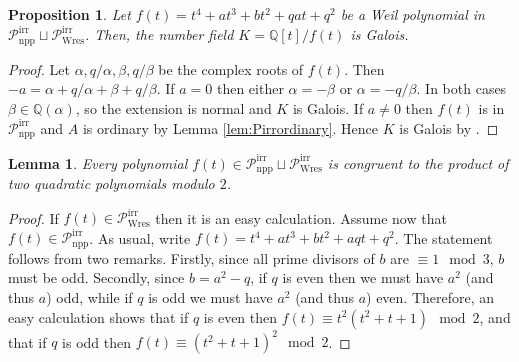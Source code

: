 \documentclass[11pt]{amsart}
\newcommand\Q{\mathbb{Q}}
\theoremstyle{plain}
\newtheorem{lemma}[theorem]{Lemma}
\newtheorem{proposition}[theorem]{Proposition}
\theoremstyle{definition}
\newcommand\PirrA{\mathcal{P}^\mathrm{irr}_\mathrm{npp}}
\newcommand\PirrB{\mathcal{P}^\mathrm{irr}_\mathrm{Wres}}
\begin{document}
\begin{proposition}\label{prop:galois}
    Let $f(t)=t^4+at^3+bt^2+qat+q^2$ be a Weil polynomial in $\PirrA\sqcup\PirrB$.
    Then, the number field $K=\Q[t]/f(t)$ is Galois.
\end{proposition}

\begin{proof}
    Let $\alpha, q/\alpha, \beta, q/\beta$ be the complex roots of $f(t)$.
    Then $-a=\alpha+q/\alpha+\beta+q/\beta$.
    If $a=0$ then either $\alpha=-\beta$ or $\alpha=-q/\beta$.
    In both cases $\beta\in\Q(\alpha)$, so the extension is normal and $K$ is Galois. 
    If $a\neq 0$ then $f(t)$ is in $\PirrA$ and $A$ is ordinary by Lemma \ref{lem:Pirrordinary}.
    Hence $K$ is Galois by \cite[Lemma 12.1]{Howe95}.
\end{proof}

\begin{lemma}\label{lemma:splitting_mod_2}
    Every polynomial $f(t) \in \PirrA\sqcup\PirrB$ is congruent to the product of two quadratic polynomials modulo $2$.
\end{lemma}
\begin{proof}
    If $f(t) \in \PirrB$ then it is an easy calculation.
    Assume now that $f(t) \in \PirrA$.
    As usual, write $f(t) = t^4+at^3+bt^2+aqt+q^2$.
    The statement follows from two remarks.
    Firstly, since all prime divisors of $b$ are $\equiv 1 \mod 3$, $b$ must be odd.
    Secondly, since $b=a^2-q$, if $q$ is even then we must have $a^2$ (and thus $a$) odd, while if $q$ is odd we must have $a^2$ (and thus $a$) even.
    Therefore, an easy calculation shows that if $q$ is even then $f(t)\equiv t^2(t^2+t+1) \mod 2$, and that if $q$ is odd then $f(t)\equiv (t^2+t+1)^2 \mod 2$.
\end{proof}
\end{document}

